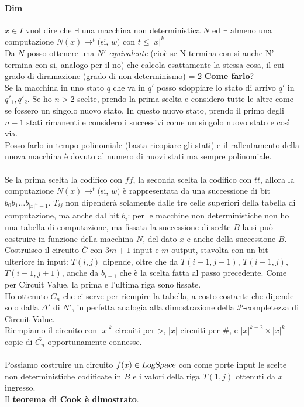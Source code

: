 \documentclass[10pt]{book}
\begin{document}
\paragraph{Dim} $x \in I$ vuol dire che $\exists$ una macchina non deterministica $N$ ed $\exists$ almeno una computazione $N(x)\longrightarrow^t($si, $w)$ con $t\leq |x|^k$\\
Da $N$ posso ottenere una $N'$ \textit{equivalente} (cioè se N termina con si anche N' termina con si, analogo per il no) che calcola esattamente la stessa cosa, il cui grado di diramazione (grado di non determinismo) = 2 \textbf{Come farlo}?\\
Se la macchina in uno stato $q$ che va in $q'$ posso sdoppiare lo stato di arrivo $q'$ in $q'_1, q'_2$. Se ho $n > 2$ scelte, prendo la prima scelta e considero tutte le altre come se fossero un singolo nuovo stato. In questo nuovo stato, prendo il primo degli $n-1$ stati rimanenti e considero i successivi come un singolo nuovo stato e così via.\\
Posso farlo in tempo polinomiale (basta ricopiare gli stati) e il rallentamento della nuova macchina è dovuto al numero di nuovi stati ma sempre polinomiale.\\\\
Se la prima scelta la codifico con $ff$, la seconda scelta la codifico con $tt$, allora la computazione $N(x)\longrightarrow^t($si, $w)$ è rappresentata da una successione di bit $b_0 b_1\ldots b_{|x|^n - 1}$. $T_{ij}$ non dipenderà solamente dalle tre celle superiori della tabella di computazione, ma anche dal bit $b_i$: per le macchine non deterministiche non ho una tabella di computazione, ma fissata la successione di scelte $B$ la si può costruire in funzione della macchina $N$, del dato $x$ e anche della successione $B$.\\
Costruisco il circuito $\overline{C}$ con $3m + 1$ input e $m$ output, stavolta con un bit ulteriore in input: $T(i,j)$ dipende, oltre che da $T(i-1,j-1)$, $T(i-1,j)$, $T(i-1,j+1)$, anche da $b_{i-1}$ che è la scelta fatta al passo precedente. Come per Circuit Value, la prima e l'ultima riga sono fissate.\\
Ho ottenuto $\overline{C_n}$ che ci serve per riempire la tabella, a costo costante che dipende solo dalla $\Delta'$ di $N'$, in perfetta analogia alla dimostrazione della $\mathscr{P}$-completezza di Circuit Value.\\
Riempiamo il circuito con $|x|^k$ circuiti per $\triangleright$, $|x|$ circuiti per $\#$, e $|x|^{k-2}\times|x|^k$ copie di $\overline{C_n}$ opportunamente connesse.\\\\
Possiamo costruire un circuito $f(x)\in\textsl{LogSpace}$ con come porte input le scelte non deterministiche codificate in $B$ e i valori della riga $T(1,j)$ ottenuti da $x$ ingresso.\\
Il \textbf{teorema di Cook è dimostrato}.
\end{document}
